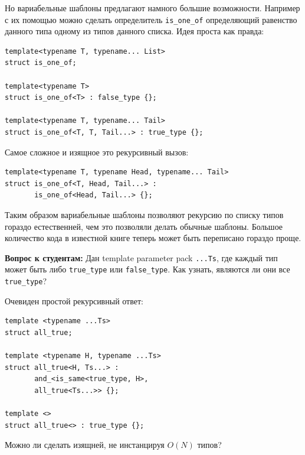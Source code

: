 \documentclass[a4paper,12pt,oneside]{article}
\newif\ifanswers
\begin{document}
Но вариабельные шаблоны предлагают намного большие возможности. Например с их помощью можно сделать определитель \lstinline!is_one_of! определяющий равенство данного типа одному из типов данного списка. Идея проста как правда:

\begin{lstlisting}
template<typename T, typename... List>
struct is_one_of;

template<typename T>
struct is_one_of<T> : false_type {};

template<typename T, typename... Tail>
struct is_one_of<T, T, Tail...> : true_type {};
\end{lstlisting}

Самое сложное и изящное это рекурсивный вызов:

\begin{lstlisting}
template<typename T, typename Head, typename... Tail>
struct is_one_of<T, Head, Tail...> : 
       is_one_of<Head, Tail...> {};
\end{lstlisting}

Таким образом вариабельные шаблоны позволяют рекурсию по списку типов гораздо естественней, чем это позволяли делать обычные шаблоны. Большое количество кода в известной книге \cite{mcpp} теперь может быть переписано гораздо проще.

\textbf{Вопрос к студентам:} Дан template parameter pack \lstinline!...Ts!, где каждый тип может быть либо \lstinline!true_type! или \lstinline!false_type!. Как узнать, являются ли они все \lstinline!true_type!?

Очевиден простой рекурсивный ответ:

\begin{lstlisting}
template <typename ...Ts>
struct all_true;

template <typename H, typename ...Ts>
struct all_true<H, Ts...> : 
       and_<is_same<true_type, H>, 
       all_true<Ts...>> {};

template <>
struct all_true<> : true_type {};
\end{lstlisting}

Можно ли сделать изящней, не инстанцируя $O(N)$ типов?

\ifanswers
Более просветляющий ответ использует кортежи:

\begin{lstlisting}
template <typename H, typename ...Ts>
struct all_true<H, Ts...> : 
       and_<is_same<true_type, H>, 
       is_same<tuple<H,Ts...>,
               tuple<Ts...,H>>> {};
\end{lstlisting}
\fi
\end{document}

